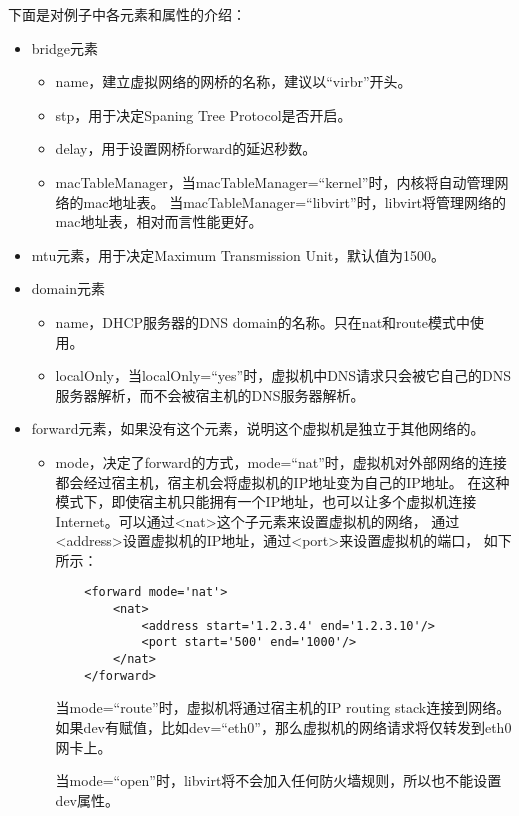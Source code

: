\documentclass[a4paper,left=2.5cm,right=2.5cm,11pt]{article}
\begin{document}
	下面是对例子中各元素和属性的介绍：
	\begin{itemize}
		\item bridge元素
		\begin{itemize}
			\item name，建立虚拟网络的网桥的名称，建议以“virbr”开头。
			\item stp，用于决定Spaning Tree Protocol是否开启。
			\item delay，用于设置网桥forward的延迟秒数。
			\item macTableManager，当macTableManager=“kernel”时，内核将自动管理网络的mac地址表。
				  当macTableManager=“libvirt”时，libvirt将管理网络的mac地址表，相对而言性能更好。
		\end{itemize}

		\item mtu元素，用于决定Maximum Transmission Unit，默认值为1500。
		\item domain元素
		\begin{itemize}
			\item name，DHCP服务器的DNS domain的名称。只在nat和route模式中使用。
			\item localOnly，当localOnly=“yes”时，虚拟机中DNS请求只会被它自己的DNS服务器解析，而不会被宿主机的DNS服务器解析。
		\end{itemize}

		\item forward元素，如果没有这个元素，说明这个虚拟机是独立于其他网络的。
		\begin{itemize}
			\item mode，决定了forward的方式，mode=“nat”时，虚拟机对外部网络的连接都会经过宿主机，宿主机会将虚拟机的IP地址变为自己的IP地址。
					在这种模式下，即使宿主机只能拥有一个IP地址，也可以让多个虚拟机连接Internet。可以通过<nat>这个子元素来设置虚拟机的网络，
					通过<address>设置虚拟机的IP地址，通过<port>来设置虚拟机的端口，
					如下所示：
					\begin{lstlisting}
	<forward mode='nat'>
		<nat>
			<address start='1.2.3.4' end='1.2.3.10'/>
			<port start='500' end='1000'/>
		</nat>
	</forward>
					\end{lstlisting}

					当mode=“route”时，虚拟机将通过宿主机的IP routing stack连接到网络。
					如果dev有赋值，比如dev=“eth0”，那么虚拟机的网络请求将仅转发到eth0网卡上。\par

					当mode=“open”时，libvirt将不会加入任何防火墙规则，所以也不能设置dev属性。\par


\end{itemize}
\end{itemize}
\end{document}
